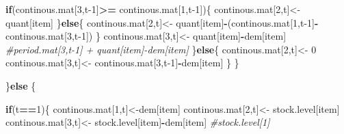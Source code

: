 \documentclass[
]{article}
\newenvironment{Shaded}{\begin{snugshade}}{\end{snugshade}}
\newcommand{\CommentTok}[1]{\textcolor[rgb]{0.56,0.35,0.01}{\textit{#1}}}
\newcommand{\ControlFlowTok}[1]{\textcolor[rgb]{0.13,0.29,0.53}{\textbf{#1}}}
\newcommand{\DecValTok}[1]{\textcolor[rgb]{0.00,0.00,0.81}{#1}}
\newcommand{\NormalTok}[1]{#1}
\newcommand{\OperatorTok}[1]{\textcolor[rgb]{0.81,0.36,0.00}{\textbf{#1}}}
\newcommand{\StringTok}[1]{\textcolor[rgb]{0.31,0.60,0.02}{#1}}
\begin{document}
\begin{Shaded}
\begin{Highlighting}[]
{     
     
     \ControlFlowTok{if}\NormalTok{(continous.mat[}\DecValTok{3}\NormalTok{,t}\DecValTok{-1}\NormalTok{]}\OperatorTok{>=}\StringTok{ }\NormalTok{continous.mat[}\DecValTok{1}\NormalTok{,t}\DecValTok{-1}\NormalTok{])\{}
\NormalTok{       continous.mat[}\DecValTok{2}\NormalTok{,t]<-}\StringTok{ }\NormalTok{quant[item]}
\NormalTok{     \}}\ControlFlowTok{else}\NormalTok{\{}
\NormalTok{       continous.mat[}\DecValTok{2}\NormalTok{,t]<-}\StringTok{ }\NormalTok{quant[item]}\OperatorTok{-}\NormalTok{(continous.mat[}\DecValTok{1}\NormalTok{,t}\DecValTok{-1}\NormalTok{]}\OperatorTok{-}\NormalTok{continous.mat[}\DecValTok{3}\NormalTok{,t}\DecValTok{-1}\NormalTok{])}
\NormalTok{     \}}
\NormalTok{     continous.mat[}\DecValTok{3}\NormalTok{,t]<-}\StringTok{ }\NormalTok{quant[item]}\OperatorTok{-}\NormalTok{dem[item] }\CommentTok{#period.mat[3,t-1] + quant[item]-dem[item]}
\NormalTok{    \}}\ControlFlowTok{else}\NormalTok{\{}
\NormalTok{     continous.mat[}\DecValTok{2}\NormalTok{,t]<-}\StringTok{ }\DecValTok{0}
\NormalTok{      continous.mat[}\DecValTok{3}\NormalTok{,t]<-}\StringTok{ }\NormalTok{continous.mat[}\DecValTok{3}\NormalTok{,t}\DecValTok{-1}\NormalTok{]}\OperatorTok{-}\NormalTok{dem[item]}
\NormalTok{    \}}
\NormalTok{  \}}
    
      
\NormalTok{    \}}\ControlFlowTok{else}\NormalTok{ \{}
        
      
      
          \ControlFlowTok{if}\NormalTok{(t}\OperatorTok{==}\DecValTok{1}\NormalTok{)\{}
\NormalTok{    continous.mat[}\DecValTok{1}\NormalTok{,t]<-dem[item]}
\NormalTok{    continous.mat[}\DecValTok{2}\NormalTok{,t]<-}\StringTok{ }\NormalTok{stock.level[item]}
\NormalTok{    continous.mat[}\DecValTok{3}\NormalTok{,t]<-}\StringTok{ }\NormalTok{stock.level[item]}\OperatorTok{-}\NormalTok{dem[item] }\CommentTok{#stock.level[1]}
    
}
\end{Highlighting}
\end{Shaded}
\end{document}
